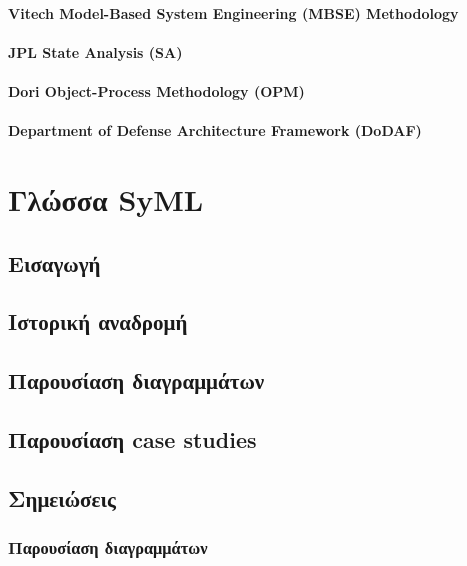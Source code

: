 \documentclass[a4paper,12pt,twoside]{report}
\begin{document}
{			\subsubsection{Vitech Model-Based System Engineering (MBSE) Methodology}
			\subsubsection{JPL State Analysis (SA)}
			\subsubsection{Dori Object-Process Methodology (OPM)}
			\subsubsection{Department of Defense Architecture Framework (DoDAF)}
	
	\chapter{Γλώσσα SyML}
		\label{κεφ.:Γλώσσα SyML}
		
		\section{Εισαγωγή}
		\section{Ιστορική αναδρομή}
		\section{Παρουσίαση διαγραμμάτων}
		\section{Παρουσίαση case studies}


		\section{Σημειώσεις}	
		\subsection{Παρουσίαση διαγραμμάτων \cite{APracticalGuideToSysML}}
			
}
\end{document}
